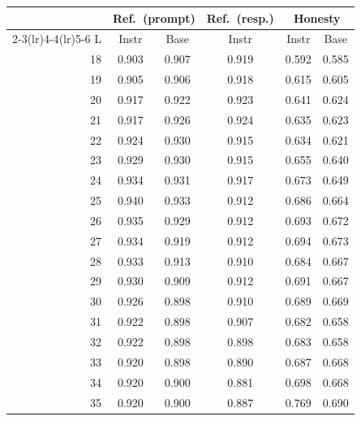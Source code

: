 \documentclass[11pt]{article}
\begin{document}
\par\medskip
{\centering
  \small
  \setlength{\tabcolsep}{4pt}
  \begin{tabular}{rccccc}
    \toprule
    & \multicolumn{2}{c}{Ref.\ (prompt)} & Ref.\ (resp.) & \multicolumn{2}{c}{Honesty} \\
    \cmidrule(lr){2-3}\cmidrule(lr){4-4}\cmidrule(lr){5-6}
    L & Instr & Base & Instr & Instr & Base \\
    \midrule
    18 & 0.903 & 0.907 & 0.919 & 0.592 & 0.585 \\
    19 & 0.905 & 0.906 & 0.918 & 0.615 & 0.605 \\
    20 & 0.917 & 0.922 & 0.923 & 0.641 & 0.624 \\
    21 & 0.917 & 0.926 & 0.924 & 0.635 & 0.623 \\
    22 & 0.924 & 0.930 & 0.915 & 0.634 & 0.621 \\
    23 & 0.929 & 0.930 & 0.915 & 0.655 & 0.640 \\
    24 & 0.934 & 0.931 & 0.917 & 0.673 & 0.649 \\
    25 & 0.940 & 0.933 & 0.912 & 0.686 & 0.664 \\
    26 & 0.935 & 0.929 & 0.912 & 0.693 & 0.672 \\
    27 & 0.934 & 0.919 & 0.912 & 0.694 & 0.673 \\
    28 & 0.933 & 0.913 & 0.910 & 0.684 & 0.667 \\
    29 & 0.930 & 0.909 & 0.912 & 0.691 & 0.667 \\
    30 & 0.926 & 0.898 & 0.910 & 0.689 & 0.669 \\
    31 & 0.922 & 0.898 & 0.907 & 0.682 & 0.658 \\
    32 & 0.922 & 0.898 & 0.898 & 0.683 & 0.658 \\
    33 & 0.920 & 0.898 & 0.890 & 0.687 & 0.668 \\
    34 & 0.920 & 0.900 & 0.881 & 0.698 & 0.668 \\
    35 & 0.920 & 0.900 & 0.887 & 0.769 & 0.690 \\
    \bottomrule
  \end{tabular}
  \label{tab:layerwise-b}
  \par}
\end{document}
